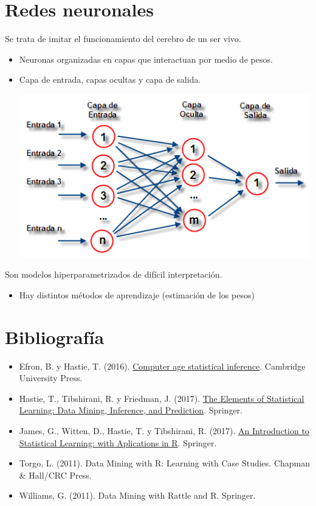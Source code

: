\documentclass[]{book}
\providecommand{\tightlist}{%
  \setlength{\itemsep}{0pt}\setlength{\parskip}{0pt}}
\begin{document}
\hypertarget{redes-neuronales}{%
\section{Redes neuronales}\label{redes-neuronales}}

Se trata de imitar el funcionamiento del cerebro de un ser vivo.

\begin{itemize}
\item
  Neuronas organizadas en capas que interactuan por medio de pesos.
\item
  Capa de entrada, capas ocultas y capa de salida.

  \includegraphics[width=6.88in]{images/nn}
\end{itemize}

Son modelos hiperparametrizados de difícil interpretación.

\begin{itemize}
\tightlist
\item
  Hay distintos métodos de aprendizaje (estimación de los pesos)
\end{itemize}

\hypertarget{bibliografia}{%
\section{Bibliografía}\label{bibliografia}}

\begin{itemize}
\item
  Efron, B. y Hastie, T. (2016). \href{http://web.stanford.edu/~hastie/CASI/}{Computer age statistical inference}.
  Cambridge University Press.
\item
  Hastie, T., Tibshirani, R. y Friedman, J. (2017).
  \href{https://web.stanford.edu/~hastie/ElemStatLearn}{The Elements of Statistical Learning: Data Mining, Inference, and Prediction}.
  Springer.
\item
  James, G., Witten, D., Hastie, T. y Tibshirani, R. (2017).
  \href{http://faculty.marshall.usc.edu/gareth-james/ISL}{An Introduction to Statistical Learning: with Aplications in R}.
  Springer.
\item
  Torgo, L. (2011). Data Mining with R: Learning with Case
  Studies. Chapman \& Hall/CRC Press.
\item
  Williams, G. (2011). Data Mining with Rattle and R. Springer.
\end{itemize}


\end{document}
